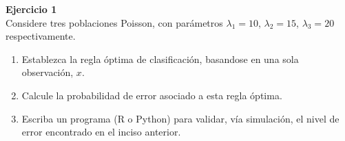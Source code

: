 \documentclass[a4paper, 11pt]{article}
\newenvironment{problem}[2][Ejercicio]
{ \begin{mdframed}[backgroundcolor= red!50] \textbf{#1 #2} \\}
	{  \end{mdframed}}
\begin{document}
	\setlength{\parskip}{\medskipamount}
	\setlength{\parindent}{0pt}
 
\begin{problem}{1}
Considere tres poblaciones Poisson, con parámetros $\lambda_1 = 10$, $\lambda_2 = 15$, $\lambda_3 = 20$ respectivamente.
\begin{enumerate}
    \item Establezca la regla óptima de clasificación, basandose en una sola observación, $x$.
    \item Calcule la probabilidad de error asociado a esta regla óptima.
    \item Escriba un programa (R o Python) para validar, vía simulación, el nivel de error encontrado en el inciso anterior.
\end{enumerate}

\end{problem}
	
\end{document}
